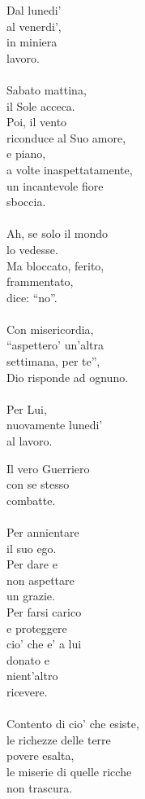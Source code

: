 \begin{haiku}
Dal lunedi' \\
    al venerdi',\\
in miniera\\
    lavoro.\\
\leavevmode\\
Sabato mattina,\\
il Sole acceca.\\
Poi, il vento\\
riconduce al Suo amore,\\
e piano,\\
    a volte inaspettatamente,\\
un incantevole fiore\\
    sboccia.\\
\leavevmode\\
Ah, se solo il mondo\\
    lo vedesse.\\
Ma bloccato, ferito,\\
    frammentato,\\
    dice: ``no''.\\
\leavevmode\\
Con misericordia,\\
``aspettero' un'altra\\
settimana, per te'',\\
Dio risponde ad ognuno.\\
\leavevmode\\
    Per Lui,\\
    nuovamente lunedi'\\
    al lavoro.\\
\end{haiku}

\begin{haiku}
Il vero Guerriero\\
con se stesso\\
combatte.\\
\leavevmode\\
Per annientare \\
    il suo ego.\\
Per dare e \\
    non aspettare \\
    un grazie.\\
Per farsi carico\\
e proteggere\\
cio' che e' a lui\\
donato e\\
nient'altro \\
ricevere.\\
\leavevmode\\
Contento di cio' che esiste,\\
le richezze delle terre\\
povere esalta,\\
le miserie di quelle ricche\\
non trascura.\\
\end{haiku}

